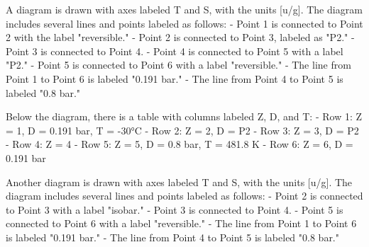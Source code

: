 A diagram is drawn with axes labeled T and S, with the units [u/g]. The diagram includes several lines and points labeled as follows: 
- Point 1 is connected to Point 2 with the label "reversible."
- Point 2 is connected to Point 3, labeled as "P2."
- Point 3 is connected to Point 4.
- Point 4 is connected to Point 5 with a label "P2."
- Point 5 is connected to Point 6 with a label "reversible."
- The line from Point 1 to Point 6 is labeled "0.191 bar."
- The line from Point 4 to Point 5 is labeled "0.8 bar."

Below the diagram, there is a table with columns labeled Z, D, and T:
- Row 1: Z = 1, D = 0.191 bar, T = -30°C
- Row 2: Z = 2, D = P2
- Row 3: Z = 3, D = P2
- Row 4: Z = 4
- Row 5: Z = 5, D = 0.8 bar, T = 481.8 K
- Row 6: Z = 6, D = 0.191 bar

Another diagram is drawn with axes labeled T and S, with the units [u/g]. The diagram includes several lines and points labeled as follows:
- Point 2 is connected to Point 3 with a label "isobar."
- Point 3 is connected to Point 4.
- Point 5 is connected to Point 6 with a label "reversible."
- The line from Point 1 to Point 6 is labeled "0.191 bar."
- The line from Point 4 to Point 5 is labeled "0.8 bar."